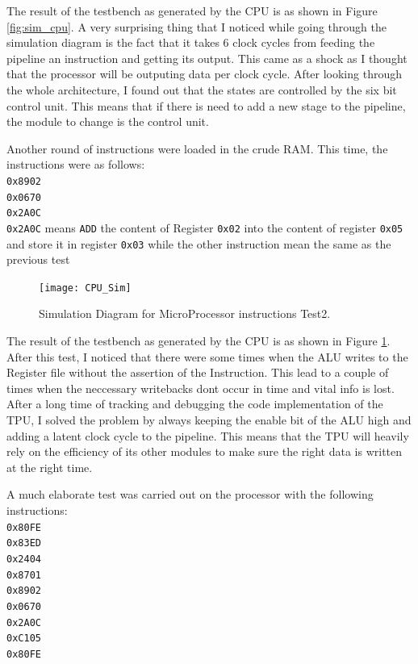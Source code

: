 The result of the testbench as generated by the CPU is as shown in Figure \ref{fig:sim_cpu}.
A very surprising thing that I noticed while going through the simulation diagram is the fact that it takes 6 clock cycles from feeding the pipeline an instruction and getting its output. This came as a shock as I thought that the processor will be outputing data per clock cycle. After looking through the whole architecture, I found out that the states are controlled by the six bit control unit. This means that if there is need to add a new stage to the pipeline, the module to change is the control unit.

Another round of instructions were loaded in the crude RAM. This time, the instructions were as follows:\\
\verb|0x8902| \\
\verb|0x0670|	\\
\verb|0x2A0C|	\\
\verb|0x2A0C| means \verb|ADD| the content of Register \verb|0x02| into the content of register \verb|0x05| and store it in register \verb|0x03| while the other instruction mean the same as the previous test

\begin{figure}
    \centering
    \texttt{[image: CPU\_Sim]}
	\caption{Simulation Diagram for MicroProcessor instructions Test2.}
    \label{fig:sim_cpu_2}
\end{figure}

The result of the testbench as generated by the CPU is as shown in Figure \ref{fig:sim_cpu_2}. After this test, I noticed that there were some times when the ALU writes to the Register file without the assertion of the Instruction. This lead to a couple of times when the neccessary writebacks dont occur in time and vital info is lost. After a long time of tracking and debugging the code implementation of the TPU, I solved the problem by always keeping the enable bit of the ALU high and adding a latent clock cycle to the pipeline. This means that the TPU will heavily rely on the efficiency of its other modules to make sure the right data is written at the right time. 

A much elaborate test was carried out on the processor with the following instructions:\\
\verb|0x80FE| \\
\verb|0x83ED|	\\
\verb|0x2404|	\\
\verb|0x8701| \\
\verb|0x8902|	\\
\verb|0x0670|	\\
\verb|0x2A0C|	\\
\verb|0xC105| \\
\verb|0x80FE|	\\

